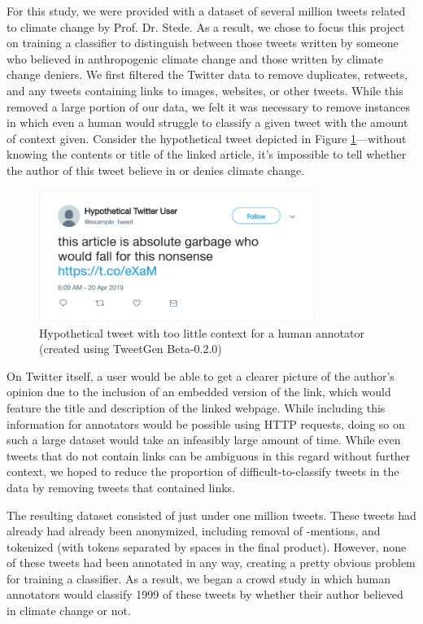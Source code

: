 \documentclass[article,oneside,a4paper,12pt]{memoir}
\begin{document}
For this study, we were provided with a dataset of several million tweets related to climate change by Prof. Dr. Stede. As a result, we chose to focus this project on training a classifier to distinguish between those tweets written by someone who believed in anthropogenic climate change and those written by climate change deniers. We first filtered the Twitter data to remove duplicates, retweets, and any tweets containing links to images, websites, or other tweets. While this removed a large portion of our data, we felt it was necessary to remove instances in which even a human would struggle to classify a given tweet with the amount of context given. Consider the hypothetical tweet depicted in Figure \ref{fig:hypothetical}---without knowing the contents or title of the linked article, it's impossible to tell whether the author of this tweet believe in or denies climate change.

\begin{figure}[htb]
    \centering
    \includegraphics[width=0.8\textwidth, frame]{hypothetical-tweet}
    \caption{Hypothetical tweet with too little context for a human annotator (created using TweetGen Beta-0.2.0)}
    \label{fig:hypothetical}
\end{figure}

On Twitter itself, a user would be able to get a clearer picture of the author's opinion due to the inclusion of an embedded version of the link, which would feature the title and description of the linked webpage. While including this information for annotators would be possible using HTTP requests, doing so on such a large dataset would take an infeasibly large amount of time. While even tweets that do not contain links can be ambiguous in this regard without further context, we hoped to reduce the proportion of difficult-to-classify tweets in the data by removing tweets that contained links.

The resulting dataset consisted of just under one million tweets. These tweets had already had already been anonymized, including removal of \@-mentions, and tokenized (with tokens separated by spaces in the final product). However, none of these tweets had been annotated in any way, creating a pretty obvious problem for training a classifier. As a result, we began a crowd study in which human annotators would classify 1999 of these tweets by whether their author believed in climate change or not.
\end{document}

